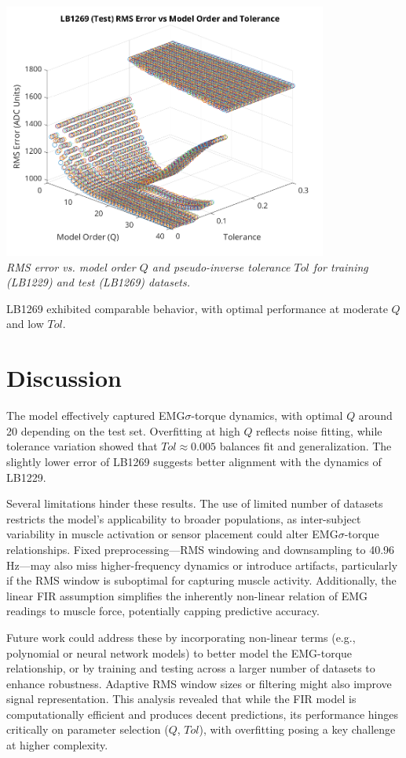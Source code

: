 \documentclass[12pt]{article}
\begin{document}
\begin{center}
     \includegraphics[width=0.8\textwidth]{plots/lab1_tol_test_69.png} \\
     \textit{RMS error vs. model order $Q$ and pseudo-inverse tolerance $Tol$ for training (LB1229) and test (LB1269) datasets.}
\end{center}
LB1269 exhibited comparable behavior, with optimal performance at moderate $Q$ and low $Tol$.

\newpage
\section*{Discussion}
The model effectively captured EMG$\sigma$-torque dynamics, with optimal $Q$ around 20 depending on the test set. Overfitting at high $Q$ reflects noise fitting, while tolerance variation showed that $Tol \approx 0.005$ balances fit and generalization. The slightly lower error of LB1269 suggests better alignment with the dynamics of LB1229.

Several limitations hinder these results. The use of limited number of datasets restricts the model’s applicability to broader populations, as inter-subject variability in muscle activation or sensor placement could alter EMG$\sigma$-torque relationships. Fixed preprocessing—RMS windowing and downsampling to 40.96 Hz—may also miss higher-frequency dynamics or introduce artifacts, particularly if the RMS window is suboptimal for capturing muscle activity. Additionally, the linear FIR assumption simplifies the inherently non-linear relation of EMG readings to muscle force, potentially capping predictive accuracy.

Future work could address these by incorporating non-linear terms (e.g., polynomial or neural network models) to better model the EMG-torque relationship, or by training and testing across a larger number of datasets to enhance robustness. Adaptive RMS window sizes or filtering might also improve signal representation. This analysis revealed that while the FIR model is computationally efficient and produces decent predictions, its performance hinges critically on parameter selection ($Q$, $Tol$), with overfitting posing a key challenge at higher complexity.
\end{document}
